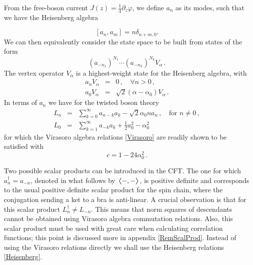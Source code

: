 \documentclass[a4paper,10pt]{article}
\newcommand{\spininner}[2]{\scalebox{1.5}[1]{$\langle$}  #1, #2 \scalebox{1.5}[1]{$\rangle$} }
\begin{document}
From the free-boson current $J(z)=\frac{1}{4}\partial_z \varphi$, we define $a_n$ as its modes, such that we have the Heisenberg algebra

\begin{equation}\label{Heisenberg}
[a_n,a_m]=n\delta_{n+m,0}.
\end{equation}
We can then equivalently consider the state space to be built from states of the form
\begin{equation}\label{Fock_a_n}
 (a_{-n_1})^{N_1} \cdots (a_{-n_k})^{N_k}  V_\alpha \,.
\end{equation}
The vertex operator $V_\alpha$ is a highest-weight state for the Heisenberg algebra, with 
\begin{subequations}\label{Heis_weight}
\begin{eqnarray}
a_n V_\alpha &=& 0 \,, \quad \forall n> 0 \,, \\
a_0 V_\alpha &=& \sqrt{2}(\alpha-\alpha_0)V_\alpha \,.
\end{eqnarray}
\end{subequations}
%
In terms of $a_n$ we have for the twisted boson theory
%
\begin{subequations}\label{Vir_gens}
\begin{eqnarray}
L_n &=& \sum_{k=0}^\infty a_{n-k}a_k -\sqrt{2}\alpha_0 n a_n \,, \quad \mbox{for } n\neq 0 \,, \\
L_0 &=& \sum_{k=1}^\infty a_{-k}a_k + \frac{1}{2}a_0^2 -  \alpha_0^2
\end{eqnarray}
\end{subequations}
% 
for which the 
Virasoro algebra relations \eqref{Virasoro} are readily shown to be satisfied with
%
\begin{equation}
 c=1-24\alpha_0^2 \,.
\end{equation}

Two possible scalar products can be introduced in the CFT.  The one for which 
$a_n^\dagger = a_{-n}$, denoted in what follows by $\spininner{-}{-}$, is positive definite and corresponds to the  usual positive definite scalar product for the spin chain, where the  conjugation sending a  ket to a bra is anti-linear.  A crucial observation is that for this scalar product  $L^\dagger_n \neq L_{-n}$.  This means that norm squares of descendants cannot be obtained using  Virasoro algebra commutation relations. Also, this scalar product must be used with great care when calculating correlation functions; this point is discussed more in appendix \ref{RemScalProd}. 
Instead of using the Virasoro relations directly we shall use the Heisenberg relations \eqref{Heisenberg}.
 
\end{document}
